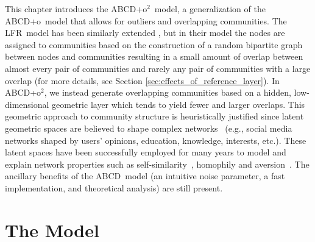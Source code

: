 \documentclass[review,los,12pt]{ryethesis}
\newcommand{\abcd}{{ABCD}}
\newcommand{\abcdo}{{ABCD+o}}
\newcommand{\abcdoo}{{ABCD+o$^2$}}
\newcommand{\lfr}{{LFR}}
\begin{document}
This chapter introduces the \abcdoo\ model, a generalization of the \abcdo\ model that allows for outliers and overlapping communities.
The \lfr\ model has been similarly extended \cite{lfro}, but in their model the nodes are assigned to communities based on the construction of a random bipartite graph between nodes and communities resulting in a small amount of overlap between almost every pair of communities and rarely any pair of communities with a large overlap (for more details, see Section \ref{sec:effects_of_reference_layer}).
In \abcdoo, we instead generate overlapping communities based on a hidden, low-dimensional geometric layer which tends to yield fewer and larger overlaps.
This geometric approach to community structure is heuristically justified since latent geometric spaces are believed to shape complex networks~\cite{boguna2021network,serrano2021shortest} (e.g., social media networks shaped by users' opinions, education, knowledge, interests, etc.).
These latent spaces have been successfully employed for many years to model and explain network properties such as self-similarity~\cite{serrano2008self}, homophily and aversion~\cite{henry2011emergence}.
The ancillary benefits of the \abcd\ model (an intuitive noise parameter, a fast implementation, and theoretical analysis) are still present.

\section{The Model}
\end{document}
